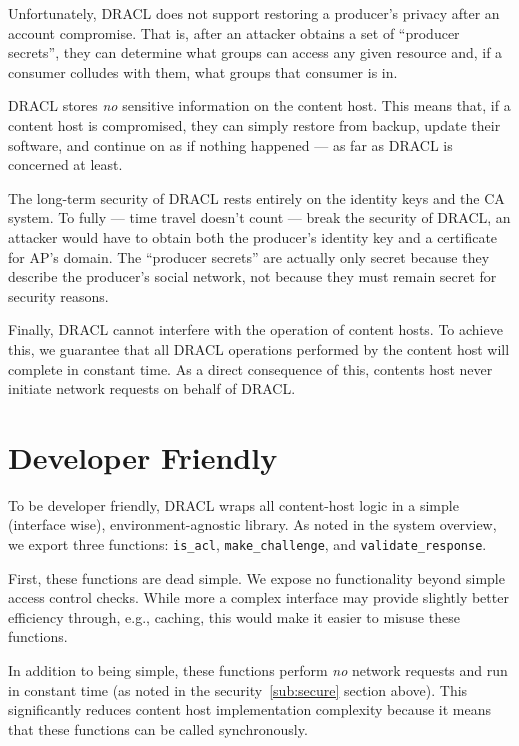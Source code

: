 \documentclass[pdftex,12pt,a4papaer,twoside,notitlepage]{report}
\begin{document}
\label{par:restore-privacy}
Unfortunately, DRACL does not support restoring a producer's privacy after an
account compromise. That is, after an attacker obtains a set of ``producer
secrets'', they can determine what groups can access any given resource and, if
a consumer colludes with them, what groups that consumer is in.

DRACL stores \emph{no} sensitive information on the content host. This means
that, if a content host is compromised, they can simply restore from backup,
update their software, and continue on as if nothing happened --- as far as
DRACL is concerned at least.

The long-term security of DRACL rests entirely on the identity keys and the CA
system. To fully --- time travel doesn't count --- break the security of DRACL,
an attacker would have to obtain both the producer's identity key and a
certificate for AP's domain. The ``producer secrets'' are actually only secret
because they describe the producer's social network, not because they must
remain secret for security reasons.

Finally, DRACL cannot interfere with the operation of content hosts. To achieve
this, we guarantee that all DRACL operations performed by the content host will
complete in constant time. As a direct consequence of this, contents host never
initiate network requests on behalf of DRACL\@.

\section{Developer Friendly}

To be developer friendly, DRACL wraps all content-host logic in a simple
(interface wise), environment-agnostic library. As noted in the system overview,
we export three functions: \verb=is_acl=, \verb=make_challenge=, and
\verb=validate_response=.

First, these functions are dead simple. We expose no functionality beyond simple
access control checks. While more a complex interface may provide slightly better
efficiency through, e.g., caching, this would make it easier to misuse these
functions.

In addition to being simple, these functions perform \emph{no} network requests
and run in constant time (as noted in the security~\cref{sub:secure} section
above). This significantly reduces content host implementation complexity
because it means that these functions can be called synchronously.
\end{document}

